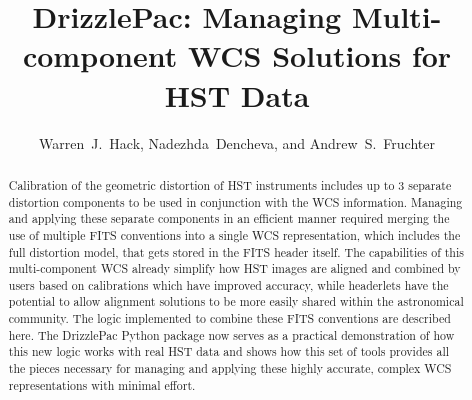 
\resetcounters




\title{DrizzlePac: Managing Multi-component WCS Solutions for HST Data}
\author{Warren~J.~Hack, Nadezhda~Dencheva, and Andrew~S.~Fruchter
}


\begin{abstract}
Calibration of the geometric distortion of HST instruments includes up to 3 separate distortion components to be used in conjunction with the WCS information. Managing and applying these separate components in an efficient manner required merging the use of multiple FITS conventions into a single WCS representation, which includes the full distortion model, that gets stored in the FITS header itself. The capabilities of this multi-component WCS already simplify how HST images are aligned and combined by users based on calibrations which have improved accuracy, while headerlets have the potential to allow alignment solutions to be more easily shared within the astronomical community. The logic implemented to combine these FITS conventions are described here. The DrizzlePac Python package now serves as a practical demonstration of how this new logic works with real HST data and shows how this set of tools provides all the pieces necessary for managing and applying these highly accurate, complex WCS representations with minimal effort. 
\end{abstract}


